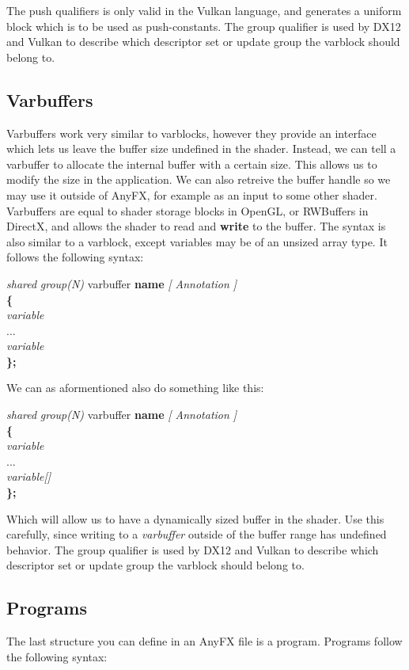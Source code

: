 \documentclass{article}
\newcommand{\SyntaxBox}[1]
{	
	\begin{center}
	\colorbox{orange!60}
	{
		\begin{minipage}{\linewidth}
		\hfill
		\begin{tabbing}
		#1
		\end{tabbing}
		\end{minipage}
	}
	\end{center}
}
\begin{document}
The push qualifiers is only valid in the Vulkan language, and generates a uniform block which is to be used as push-constants. The group qualifier is used by DX12 and Vulkan to describe which descriptor set or update group the varblock should belong to. 

\subsection{Varbuffers}
Varbuffers work very similar to varblocks, however they provide an interface which lets us leave the buffer size undefined in the shader. Instead, we can tell a varbuffer to allocate the internal buffer with a certain size. This allows us to modify the size in the application. We can also retreive the buffer handle so we may use it outside of AnyFX, for example as an input to some other shader. Varbuffers are equal to shader storage blocks in OpenGL, or RWBuffers in DirectX, and allows the shader to read and \textbf{write} to the buffer. The syntax is also similar to a varblock, except variables may be of an unsized array type. It follows the following syntax:

\SyntaxBox
{
	\textit{shared} \textit{group(N)} varbuffer \textbf{name} \textit{[ Annotation ]} \\
	\textbf{\{} \= \\
	\>	\textit{variable} \\
	\>	...	\\
	\>	\textit{variable} \\
	\textbf{\};}
}

We can as aformentioned also do something like this:

\SyntaxBox
{
	\textit{shared} \textit{group(N)} varbuffer \textbf{name} \textit{[ Annotation ]} \\
	\textbf{\{} \= \\
	\>	\textit{variable} \\
	\>	...	\\
	\>	\textit{variable[]} \\
	\textbf{\};}
}

Which will allow us to have a dynamically sized buffer in the shader. Use this carefully, since writing to a \textit{varbuffer} outside of the buffer range has undefined behavior. The group qualifier is used by DX12 and Vulkan to describe which descriptor set or update group the varblock should belong to. 

\subsection{Programs}
The last structure you can define in an AnyFX file is a program. Programs follow the following syntax:
\end{document}
